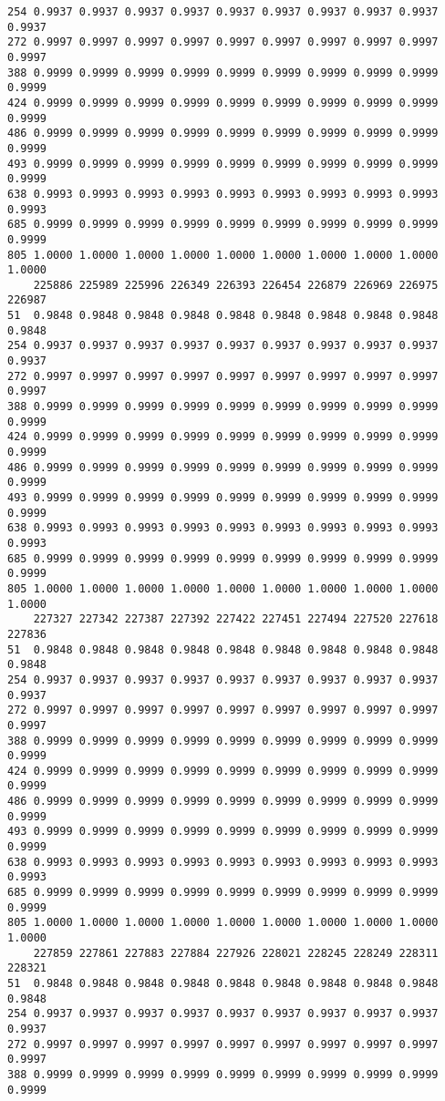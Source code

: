 \documentclass[
]{report}
\begin{document}
\begin{verbatim}
254 0.9937 0.9937 0.9937 0.9937 0.9937 0.9937 0.9937 0.9937 0.9937 0.9937
272 0.9997 0.9997 0.9997 0.9997 0.9997 0.9997 0.9997 0.9997 0.9997 0.9997
388 0.9999 0.9999 0.9999 0.9999 0.9999 0.9999 0.9999 0.9999 0.9999 0.9999
424 0.9999 0.9999 0.9999 0.9999 0.9999 0.9999 0.9999 0.9999 0.9999 0.9999
486 0.9999 0.9999 0.9999 0.9999 0.9999 0.9999 0.9999 0.9999 0.9999 0.9999
493 0.9999 0.9999 0.9999 0.9999 0.9999 0.9999 0.9999 0.9999 0.9999 0.9999
638 0.9993 0.9993 0.9993 0.9993 0.9993 0.9993 0.9993 0.9993 0.9993 0.9993
685 0.9999 0.9999 0.9999 0.9999 0.9999 0.9999 0.9999 0.9999 0.9999 0.9999
805 1.0000 1.0000 1.0000 1.0000 1.0000 1.0000 1.0000 1.0000 1.0000 1.0000
    225886 225989 225996 226349 226393 226454 226879 226969 226975 226987
51  0.9848 0.9848 0.9848 0.9848 0.9848 0.9848 0.9848 0.9848 0.9848 0.9848
254 0.9937 0.9937 0.9937 0.9937 0.9937 0.9937 0.9937 0.9937 0.9937 0.9937
272 0.9997 0.9997 0.9997 0.9997 0.9997 0.9997 0.9997 0.9997 0.9997 0.9997
388 0.9999 0.9999 0.9999 0.9999 0.9999 0.9999 0.9999 0.9999 0.9999 0.9999
424 0.9999 0.9999 0.9999 0.9999 0.9999 0.9999 0.9999 0.9999 0.9999 0.9999
486 0.9999 0.9999 0.9999 0.9999 0.9999 0.9999 0.9999 0.9999 0.9999 0.9999
493 0.9999 0.9999 0.9999 0.9999 0.9999 0.9999 0.9999 0.9999 0.9999 0.9999
638 0.9993 0.9993 0.9993 0.9993 0.9993 0.9993 0.9993 0.9993 0.9993 0.9993
685 0.9999 0.9999 0.9999 0.9999 0.9999 0.9999 0.9999 0.9999 0.9999 0.9999
805 1.0000 1.0000 1.0000 1.0000 1.0000 1.0000 1.0000 1.0000 1.0000 1.0000
    227327 227342 227387 227392 227422 227451 227494 227520 227618 227836
51  0.9848 0.9848 0.9848 0.9848 0.9848 0.9848 0.9848 0.9848 0.9848 0.9848
254 0.9937 0.9937 0.9937 0.9937 0.9937 0.9937 0.9937 0.9937 0.9937 0.9937
272 0.9997 0.9997 0.9997 0.9997 0.9997 0.9997 0.9997 0.9997 0.9997 0.9997
388 0.9999 0.9999 0.9999 0.9999 0.9999 0.9999 0.9999 0.9999 0.9999 0.9999
424 0.9999 0.9999 0.9999 0.9999 0.9999 0.9999 0.9999 0.9999 0.9999 0.9999
486 0.9999 0.9999 0.9999 0.9999 0.9999 0.9999 0.9999 0.9999 0.9999 0.9999
493 0.9999 0.9999 0.9999 0.9999 0.9999 0.9999 0.9999 0.9999 0.9999 0.9999
638 0.9993 0.9993 0.9993 0.9993 0.9993 0.9993 0.9993 0.9993 0.9993 0.9993
685 0.9999 0.9999 0.9999 0.9999 0.9999 0.9999 0.9999 0.9999 0.9999 0.9999
805 1.0000 1.0000 1.0000 1.0000 1.0000 1.0000 1.0000 1.0000 1.0000 1.0000
    227859 227861 227883 227884 227926 228021 228245 228249 228311 228321
51  0.9848 0.9848 0.9848 0.9848 0.9848 0.9848 0.9848 0.9848 0.9848 0.9848
254 0.9937 0.9937 0.9937 0.9937 0.9937 0.9937 0.9937 0.9937 0.9937 0.9937
272 0.9997 0.9997 0.9997 0.9997 0.9997 0.9997 0.9997 0.9997 0.9997 0.9997
388 0.9999 0.9999 0.9999 0.9999 0.9999 0.9999 0.9999 0.9999 0.9999 0.9999

\end{verbatim}
\end{document}
